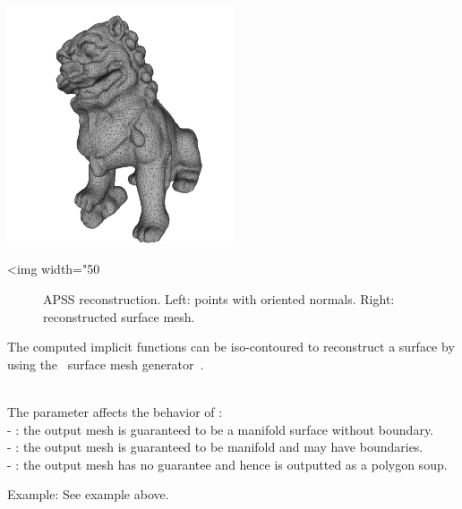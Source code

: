 \begin{center}
    \label{Surface_reconstruction_points_3-fig-APSS}
    \begin{ccTexOnly}
        \includegraphics[width=0.5\textwidth]{Surface_reconstruction_points_3/APSS} %
    \end{ccTexOnly}
    \begin{ccHtmlOnly}
        <img width="50%
    \end{ccHtmlOnly}
    \begin{figure}[h]
        \caption{APSS reconstruction.
        Left: points with oriented normals.
        Right: reconstructed surface mesh.}
    \end{figure}
\end{center}

The computed implicit functions can be iso-contoured to reconstruct a surface by using the \cgal\ surface mesh generator~\cite{cgal:ry-gsddrm-06,cgal:bo-pgsms-05}.

  \\

The parameter  affects the behavior of : \\
- : the output mesh is guaranteed to be a manifold surface without boundary.\\
- : the output mesh is guaranteed to be manifold and may have boundaries.\\
- : the output mesh has no guarantee and hence is outputted as a polygon soup.

Example:
See  example above.


